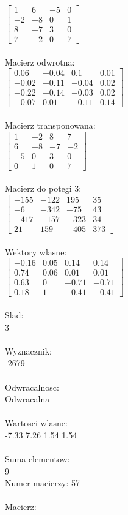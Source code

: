 \documentclass[a4paper,12pt]{article}
\begin{document}
$\begin{bmatrix} 1&6&-5&0\\-2&-8&0&1\\8&-7&3&0\\7&-2&0&7 \end{bmatrix}$
\\
\\
Macierz odwrotna:\\

$\begin{bmatrix} 0.06&-0.04&0.1&0.01\\-0.02&-0.11&-0.04&0.02\\-0.22&-0.14&-0.03&0.02\\-0.07&0.01&-0.11&0.14 \end{bmatrix}$
\\
\\
Macierz transponowana:\\

$\begin{bmatrix} 1&-2&8&7\\6&-8&-7&-2\\-5&0&3&0\\0&1&0&7 \end{bmatrix}$
\\
\\
Macierz do potegi 3:\\

$\begin{bmatrix} -155&-122&195&35\\-6&-342&-75&43\\-417&-157&-323&34\\21&159&-405&373 \end{bmatrix}$
\\
\\
Wektory wlasne:\\

$\begin{bmatrix} -0.16&0.05&0.14&0.14\\0.74&0.06&0.01&0.01\\0.63&0&-0.71&-0.71\\0.18&1&-0.41&-0.41 \end{bmatrix}$
\\
\\
Slad:\\
3
\\
\\
Wyznacznik:\\
-2679
\\
\\
Odwracalnosc:\\
Odwracalna
\\
\\
Wartosci wlasne:\\
-7.33 7.26 1.54 1.54
\\
\\
Suma elementow:\\
9
\\
\newpage
Numer macierzy:
57
\\
\\
Macierz:\\
\end{document}
